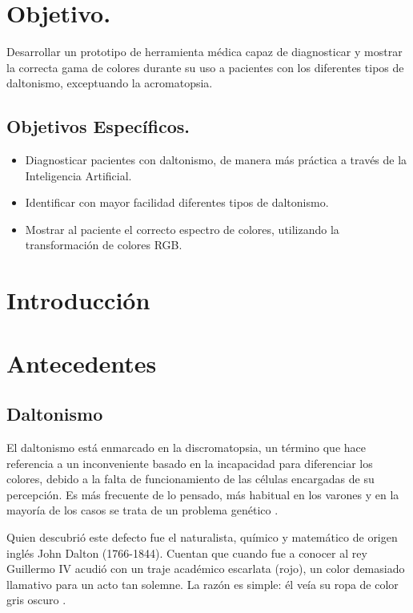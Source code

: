 \documentclass[10pt]{article}
\begin{document}
\section{Objetivo.}

Desarrollar un prototipo de herramienta médica capaz de diagnosticar y mostrar la correcta gama de colores durante su uso  a pacientes con los diferentes tipos de daltonismo, exceptuando la acromatopsia. 

\subsection{Objetivos Específicos.}
\begin{itemize}
\item Diagnosticar pacientes con daltonismo, de manera más práctica a través de la Inteligencia Artificial.
 \item Identificar con mayor facilidad diferentes tipos de daltonismo.
\item Mostrar al paciente el correcto espectro de colores, utilizando la transformación de colores RGB.
\end{itemize}


\newpage

\section{Introducción}

\section{Antecedentes}
\subsection{Daltonismo}
El daltonismo está enmarcado en la discromatopsia, un término que hace referencia a un inconveniente basado en la incapacidad para diferenciar los colores, debido a la falta de funcionamiento de las células encargadas de su percepción. Es más frecuente de lo pensado, más habitual en los varones y en la mayoría de los casos se trata de un problema genético \cite{IEEEreferencias:Ref1}\cite{IEEEreferencias:Ref2}.

\setlength{\parskip}{2mm}

Quien descubrió este defecto fue el naturalista, químico y matemático de origen inglés John Dalton (1766-1844).
Cuentan que cuando fue a conocer al rey Guillermo IV acudió con un traje académico escarlata (rojo), un color demasiado llamativo para un acto tan solemne. La razón es simple: él veía su ropa de color gris oscuro \cite{IEEEreferencias:Ref1}.
\end{document}
